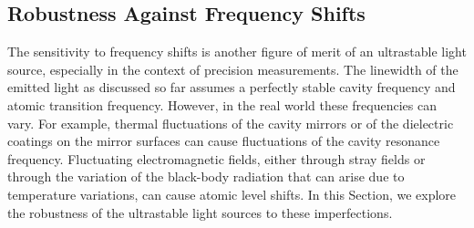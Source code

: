 \documentclass[aps,
twocolumn,
showpacs,
superscriptaddress,groupedaddress]{revtex4}
\begin{document}
\subsection{Robustness Against Frequency Shifts}

The sensitivity to frequency shifts is another figure of merit of an
ultrastable light source, especially in the context of precision
measurements.  The linewidth of the emitted light as discussed so far
assumes a perfectly stable cavity frequency and atomic transition
frequency.  However, in the real world these frequencies can vary.  For
example, thermal fluctuations of the cavity mirrors or of the dielectric
coatings on the mirror surfaces can cause fluctuations of the cavity
resonance frequency.  Fluctuating electromagnetic fields, either through
stray fields or through the variation of the black-body radiation that
can arise due to temperature variations, can cause atomic level shifts.
In this Section, we explore the robustness of the ultrastable light
sources to these imperfections.
\end{document}

